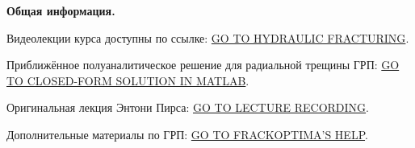 \documentclass[main.tex]{subfiles}
\begin{document}
\textbf{Общая информация.}

Видеолекции курса доступны по ссылке: \href{https://youtube.com/playlist?list=PLipUmK_65GXEpFTHhfJBaiiv7XiwMg-PM}{GO TO HYDRAULIC FRACTURING}.

Приближённое полуаналитическое решение для радиальной трещины ГРП: \href{https://datadryad.org/stash/dataset/doi:10.5061/dryad.gh469}{GO TO CLOSED-FORM SOLUTION IN MATLAB}.

Оригинальная лекция Энтони Пирса: \href{https://www.youtube.com/watch?v=PXfy5f9kWh4}{GO TO LECTURE RECORDING}.

Дополнительные материалы по ГРП: \href{http://www.frackoptima.com/userguide/index.html}{GO TO FRACKOPTIMA'S HELP}.
\end{document}
